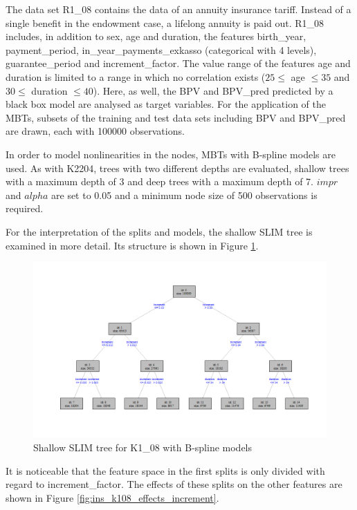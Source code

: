 The data set R1\_08 contains the data of an annuity insurance tariff. Instead of a single benefit in the endowment case, a lifelong annuity is paid out.
R1\_08 includes, in addition to sex, age and duration, the features birth\_year, payment\_period, in\_year\_payments\_exkasso (categorical with 4 levels), guarantee\_period and increment\_factor.
The value range of the features age and duration is limited to a range in which no correlation exists ($25 \leq$ age $\leq 35$ and $30 \leq$ duration $\leq 40$).
 Here, as well, the BPV and BPV\_pred predicted by a black box model are analysed as target variables.
For the application of the MBTs, subsets of the training and test data sets including BPV and BPV\_pred are drawn, each with 100000 observations.

In order to model nonlinearities in the nodes, MBTs with B-spline models are used. As with K2204, trees with two different depths are evaluated, shallow trees with a maximum depth of 3 and deep trees with a maximum depth of 7. $impr$ and $alpha$ are set to 0.05 and a minimum node size of 500 observations is required.

For the interpretation of the splits and models, the shallow SLIM tree is examined in more detail. Its structure is shown in Figure \ref{fig:ins_k108_slim_bsplines_small_tree}.

\begin{figure}[!htb]
    \centering
    \includegraphics[width = 16cm]{Figures/insurance_use_case/k1_08_BPV/slim_bsplines_small_tree.png}
    \caption{Shallow SLIM tree for K1\_08 with B-spline models}
    \label{fig:ins_k108_slim_bsplines_small_tree}
\end{figure}


It is noticeable that the feature space in the first splits is only divided with regard to increment\_factor. The effects of these splits on the other features are shown in Figure \ref{fig:ins_k108_effects_increment}.

